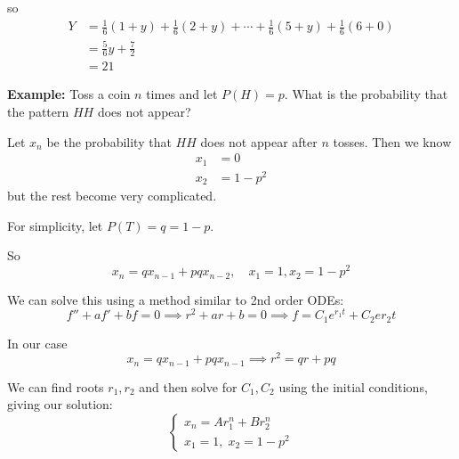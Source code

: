 \documentclass[12pt]{article}
\begin{document}
    so 
    \begin{align*}
        Y &= \frac{1}{6}(1 + y) + \frac{1}{6}(2 + y) + \cdots + \frac{1}{6}(5 + y) + \frac{1}{6}(6 + 0)\\ 
        &= \frac{5}{6}y + \frac{7}{2}\\ 
        &= 21
    \end{align*}

    \textbf{Example:} Toss a coin $n$ times and let $P(H) = p$. What is the probability that the pattern $HH$ does not appear? 

    Let $x_n$ be the probability that $HH$ does not appear after $n$ tosses. Then we know 
    \begin{align*}
        x_1 &= 0\\ 
        x_2 &= 1 - p^2
    \end{align*}
    but the rest become very complicated. 

    For simplicity, let $P(T) = q = 1 - p$.

    \begin{center}
    \end{center}

    So 
    \[x_n = qx_{n-1} + pqx_{n-2}, \quad x_1 = 1, x_2 = 1 - p^2\]

    We can solve this using a method similar to 2nd order ODEs: 
    \[f'' + af' + bf =0 \implies r^2 + ar + b = 0 \implies f = C_1e^{r_1 t} + C_2e{r_2 t}\]

    In our case 
    \[x_n = qx_{n-1} + pqx_{n-1} \implies r^2 = qr + pq\]

    We can find roots $r_1, r_2$ and then solve for $C_1, C_2$ using the initial conditions, giving our solution:
    \[\begin{cases}
        x_n = Ar_1^n + Br_2^n\\ 
        x_1 = 1, \; x_2 = 1- p^2
    \end{cases}\]
\end{document}
